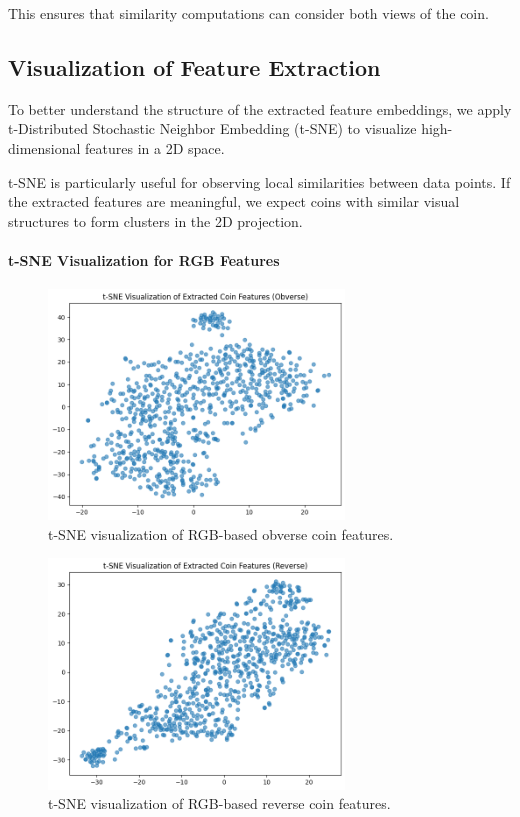 \documentclass[nolibertine, english, algorithm, nomencl, minted]{ttlab-qualify}
\begin{document}
This ensures that similarity computations can consider both views of the coin.

\subsection{Visualization of Feature Extraction}
To better understand the structure of the extracted feature embeddings, 
we apply t-Distributed Stochastic Neighbor Embedding (t-SNE) \cite{van2008visualizing} to visualize 
high-dimensional features in a 2D space. 

t-SNE is particularly useful for observing local similarities between data points. 
If the extracted features are meaningful, we expect coins with similar visual structures to form clusters in the 2D projection.

\paragraph{t-SNE Visualization for RGB Features}
\begin{figure}[H]
    \centering
    \includegraphics[width=0.7\textwidth]{static/tsne_ob_rgb.png}
    \caption{t-SNE visualization of RGB-based obverse coin features.}
    \label{fig:rgb_obverse_tsne}
\end{figure}

\begin{figure}[H]
    \centering
    \includegraphics[width=0.7\textwidth]{static/tsne_rev_rgb.png}
    \caption{t-SNE visualization of RGB-based reverse coin features.}
    \label{fig:rgb_reverse_tsne}
\end{figure}
\end{document}
